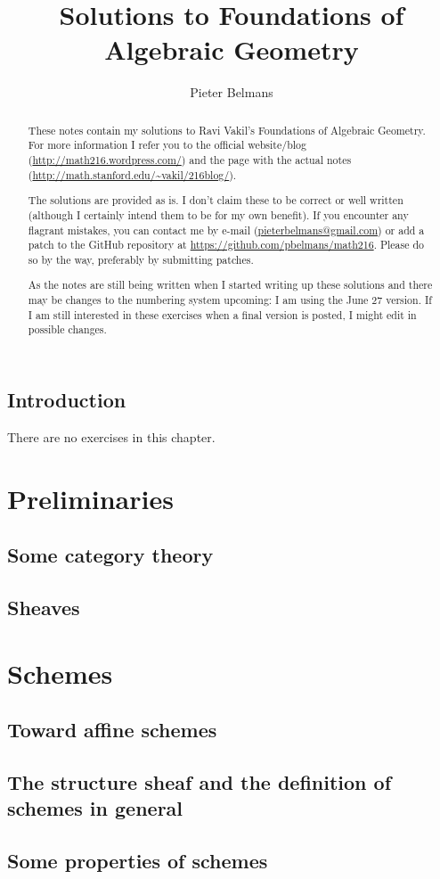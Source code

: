 \documentclass[oneside, openany]{memoir}
\title{Solutions to Foundations of Algebraic Geometry}
\author{Pieter Belmans}
\begin{document}
\maketitle

\begin{abstract}
  These notes contain my solutions to Ravi Vakil's Foundations of Algebraic Geometry. For more information I refer you to the official website/blog (\url{http://math216.wordpress.com/}) and the page with the actual notes (\url{http://math.stanford.edu/~vakil/216blog/}).
  
  The solutions are provided as is. I don't claim these to be correct or well written (although I certainly intend them to be for my own benefit). If you encounter any flagrant mistakes, you can contact me by e-mail (\url{pieterbelmans@gmail.com}) or add a patch to the GitHub repository at \url{https://github.com/pbelmans/math216}. Please do so by the way, preferably by submitting patches.

  As the notes are still being written when I started writing up these solutions and there may be changes to the numbering system upcoming: I am using the June 27 version. If I am still interested in these exercises when a final version is posted, I might edit in possible changes.
\end{abstract}

\clearpage

\tableofcontents*

\listoftodos


\chapter{Introduction}
There are no exercises in this chapter.


\part{Preliminaries}

\chapter{Some category theory}


\chapter{Sheaves}



\part{Schemes}

\chapter{Toward affine schemes}


\chapter{The structure sheaf and the definition of schemes in general}


\chapter{Some properties of schemes}

\end{document}
